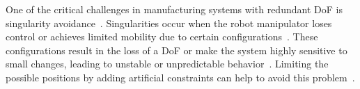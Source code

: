 One of the critical challenges in manufacturing systems with redundant DoF is singularity avoidance~\cite{Liu.2022}. Singularities occur when the robot manipulator loses control or achieves limited mobility due to certain configurations~\cite{Malyshev.2022}. These configurations result in the loss of a DoF or make the system highly sensitive to small changes, leading to unstable or unpredictable behavior~\cite{Zhao.2021, Milenkovic.2021}. Limiting the possible positions by adding artificial constraints can help to avoid this problem~\cite{Faria.2018}. %





